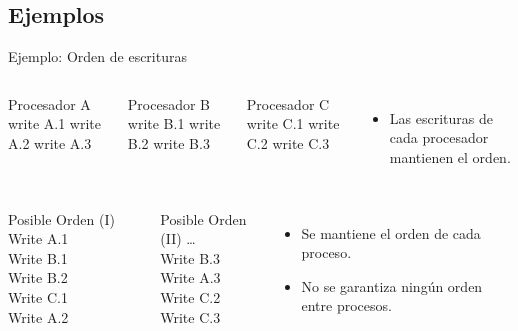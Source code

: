\subsection{Ejemplos}

\begin{frame}[t]{Ejemplo: Orden de escrituras}
\begin{columns}[T]

\begin{block}{\small Procesador A}
write A.1
write A.2
write A.3
\end{block}

\begin{block}{\small Procesador B}
write B.1
write B.2
write B.3
\end{block}

\begin{block}{\small Procesador C}
write C.1
write C.2
write C.3
\end{block}

\begin{itemize}
  \item Las escrituras de cada procesador mantienen el orden.
\end{itemize}

\end{columns}


\begin{columns}[T]


{\small
\begin{block}{Posible Orden (I)}
Write A.1\\
Write B.1\\
Write B.2\\
Write C.1\\
Write A.2\\
\end{block}
}

{\small
\begin{block}{Posible Orden (II)}
\ldots\\
Write B.3\\
Write A.3\\
Write C.2\\
Write C.3\\
\end{block}
}


\begin{itemize}
  \item Se mantiene el orden de cada proceso.
  \item No se garantiza ningún orden entre procesos.
\end{itemize}
\end{columns}

\end{frame}

